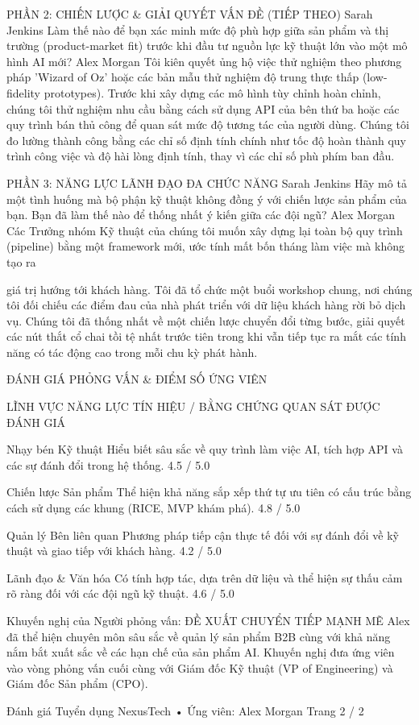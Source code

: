 PHẦN 2: CHIẾN LƯỢC \& GIẢI QUYẾT VẤN ĐỀ (TIẾP THEO)
Sarah Jenkins
Làm thế nào để bạn xác minh mức độ phù hợp giữa sản phẩm và thị trường (product-market fit) trước khi đầu tư nguồn lực kỹ thuật lớn vào một mô hình AI mới?
Alex Morgan
Tôi kiên quyết ủng hộ việc thử nghiệm theo phương pháp 'Wizard of Oz' hoặc các bản mẫu thử nghiệm độ trung thực thấp (low-fidelity prototypes). Trước khi xây dựng các mô hình tùy chỉnh hoàn chỉnh, chúng tôi thử nghiệm nhu cầu bằng cách sử dụng API của bên thứ ba hoặc các quy trình bán thủ công để quan sát mức độ tương tác của người dùng. Chúng tôi đo lường thành công bằng các chỉ số định tính chính như tốc độ hoàn thành quy trình công việc và độ hài lòng định tính, thay vì các chỉ số phù phím ban đầu.

PHẦN 3: NĂNG LỰC LÃNH ĐẠO ĐA CHỨC NĂNG
Sarah Jenkins
Hãy mô tả một tình huống mà bộ phận kỹ thuật không đồng ý với chiến lược sản phẩm của bạn. Bạn đã làm thế nào để thống nhất ý kiến giữa các đội ngũ?
Alex Morgan
Các Trưởng nhóm Kỹ thuật của chúng tôi muốn xây dựng lại toàn bộ quy trình (pipeline) bằng một framework mới, ước tính mất bốn tháng làm việc mà không tạo ra

giá trị hướng tới khách hàng. Tôi đã tổ chức một buổi workshop chung, nơi chúng tôi đối chiếu các điểm đau của nhà phát triển với dữ liệu khách hàng rời bỏ dịch vụ. Chúng tôi đã thống nhất về một chiến lược chuyển đổi từng bước, giải quyết các nút thắt cổ chai tồi tệ nhất trước tiên trong khi vẫn tiếp tục ra mắt các tính năng có tác động cao trong mỗi chu kỳ phát hành.

ĐÁNH GIÁ PHỎNG VẤN \& ĐIỂM SỐ ỨNG VIÊN

LĨNH VỰC NĂNG LỰC
TÍN HIỆU / BẰNG CHỨNG QUAN SÁT ĐƯỢC
ĐÁNH GIÁ

Nhạy bén Kỹ thuật
Hiểu biết sâu sắc về quy trình làm việc AI, tích hợp API và các sự đánh đổi trong hệ thống.
4.5 / 5.0

Chiến lược Sản phẩm
Thể hiện khả năng sắp xếp thứ tự ưu tiên có cấu trúc bằng cách sử dụng các khung (RICE, MVP khám phá).
4.8 / 5.0

Quản lý Bên liên quan
Phương pháp tiếp cận thực tế đối với sự đánh đổi về kỹ thuật và giao tiếp với khách hàng.
4.2 / 5.0

Lãnh đạo \& Văn hóa
Có tính hợp tác, dựa trên dữ liệu và thể hiện sự thấu cảm rõ ràng đối với các đội ngũ kỹ thuật.
4.6 / 5.0

Khuyến nghị của Người phỏng vấn: ĐỀ XUẤT CHUYỂN TIẾP MẠNH MẼ
Alex đã thể hiện chuyên môn sâu sắc về quản lý sản phẩm B2B cùng với khả năng nắm bắt xuất sắc về các hạn chế của sản phẩm AI. Khuyến nghị đưa ứng viên vào vòng phỏng vấn cuối cùng với Giám đốc Kỹ thuật (VP of Engineering) và Giám đốc Sản phẩm (CPO).

Đánh giá Tuyển dụng NexusTech • Ứng viên: Alex Morgan
Trang 2 / 2

